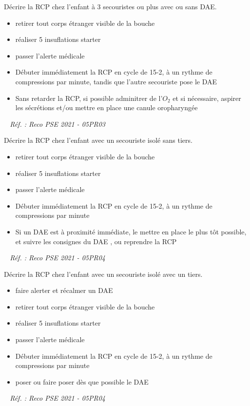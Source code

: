 \documentclass[grid,avery5371,landscape]{flashcards}
\makeatletter
\newcounter{nocarte}
\newcommand{\categ}[1]{%
  \def\@categ{#1}%
  \setcounter{nocarte}{0}%
}
\newcommand{\source}[1]{%
  \medskip
  \itshape%
   ~ \hfill Réf. : #1}
\makeatother
\begin{document}
\color[HTML]{003273}
\categ{PSE}
\begin{flashcard}[CAT]{
 Décrire la RCP chez l'enfant à 3 secouristes ou plus avec ou sans DAE.   }
  \begin{itemize} 
\item retirer tout corps étranger visible de la bouche 
\item réaliser 5 insuflations starter 
\item passer l'alerte médicale 
\item Débuter immédiatement la RCP en cycle de 15-2, à un rythme de \color{red}{???} compressions par minute, tandis que l'autre secouriste pose le DAE 
\item Sans retarder la RCP, si possible adminitrer de l'$O_2$ et si nécessaire, aspirer les sécrétions et/ou mettre en place une canule oropharyngée
 \end{itemize} 
  \source{Reco PSE 2021 - 05PR03}
\end{flashcard}


\color[HTML]{003273}
\categ{PSE}
\begin{flashcard}[CAT]{
 Décrire la RCP chez l'enfant avec un secouriste isolé sans tiers.   }
  \begin{itemize} 
\item retirer tout corps étranger visible de la bouche 
\item réaliser 5 insuflations starter 
\item passer l'alerte médicale 
\item Débuter immédiatement la RCP en cycle de 15-2, à un rythme de \color{red}{???} compressions par minute 
\item Si un DAE est à proximité immédiate, le mettre en place le plus tôt possible, et suivre les consignes du DAE , ou reprendre la RCP \end{itemize} 
  \source{Reco PSE 2021 - 05PR04}
\end{flashcard}


\color[HTML]{003273}
\categ{PSE}
\begin{flashcard}[CAT]{
 Décrire la RCP chez l'enfant avec un secouriste isolé avec un tiers.   }
  \begin{itemize} 
\item faire alerter et récalmer un DAE 
\item retirer tout corps étranger visible de la bouche 
\item réaliser 5 insuflations starter 
\item passer l'alerte médicale 
\item Débuter immédiatement la RCP en cycle de 15-2, à un rythme de \color{red}{???} compressions par minute 
\item poser ou faire poser dès que possible le DAE 
\end{itemize} 
  \source{Reco PSE 2021 - 05PR04}
\end{flashcard}
\end{document}
